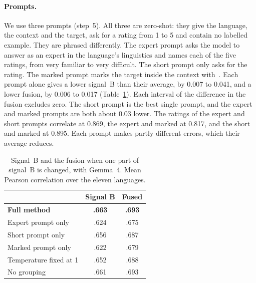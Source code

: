 \paragraph{Prompts.} We use three prompts (step~5). All three are zero-shot: they give the %
language, the context and the target, ask for a rating from 1 to 5 and contain no labelled
example. They are phrased differently. The expert prompt asks the model to answer as an expert in
the language's linguistics and names each of the five ratings, from very familiar to very
difficult. The short prompt only asks for the rating. The marked prompt marks the target inside the
context with \guillemotleft\,\guillemotright. Each prompt alone gives a lower signal~B than their
average, by 0.007 to 0.041, and a lower fusion, by 0.006 to 0.017 (Table~\ref{tab:signal-b}). Each %
interval of the difference in the fusion excludes zero. The short prompt is the best single prompt, %
and the expert and marked prompts are both about 0.03 lower. The ratings of the expert and short %
prompts correlate at 0.869, the expert and marked at 0.817, and the short and marked at 0.895. %
Each prompt makes partly different errors, which their average reduces.

\begin{table}[t]
\centering
\small
\setlength{\tabcolsep}{3pt}
\begin{tabular}{lcc}
\toprule
 & Signal B & Fused \\
\midrule
\textbf{Full method}          & \textbf{.663} & \textbf{.693} \\ %
\midrule
Expert prompt only            & .624 & .675 \\ %
Short prompt only             & .656 & .687 \\ %
Marked prompt only            & .622 & .679 \\ %
\midrule
Temperature fixed at 1        & .652 & .688 \\ %
No grouping                   & .661 & .693 \\ %
\bottomrule
\end{tabular}
\caption{Signal~B and the fusion when one part of signal~B is changed, with Gemma~4. Mean Pearson
correlation over the eleven languages.}
\label{tab:signal-b}
\end{table}

